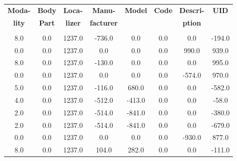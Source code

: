 \begin{table}
\centering
\begin{tabular}{|c|c|c|c|c|c|c|c|}
\bfseries{\footnotesize Moda-}&\bfseries{\footnotesize Body}&\bfseries{\footnotesize Loca-}&\bfseries{\footnotesize Manu-}&\bfseries{\footnotesize Model}&\bfseries{\footnotesize Code}&\bfseries{\footnotesize Descri-}&\bfseries{\footnotesize UID}\\
\bfseries{\footnotesize lity} & \bfseries{\footnotesize Part}& \bfseries{\footnotesize lizer}& \bfseries{\footnotesize facturer}& &\bfseries{\footnotesize  }&\bfseries{\footnotesize ption}&\\
&&&&&&&\\
\footnotesize 8.0&\footnotesize 0.0&\footnotesize 1237.0&\footnotesize -736.0&\footnotesize 0.0&\footnotesize 0.0&\footnotesize 0.0&\footnotesize -194.0\\
\footnotesize 0.0&\footnotesize 0.0&\footnotesize 1237.0&\footnotesize 0.0&\footnotesize 0.0&\footnotesize 0.0&\footnotesize 990.0&\footnotesize 939.0\\
\footnotesize 8.0&\footnotesize 0.0&\footnotesize 1237.0&\footnotesize -130.0&\footnotesize 0.0&\footnotesize 0.0&\footnotesize 0.0&\footnotesize 995.0\\
\footnotesize 0.0&\footnotesize 0.0&\footnotesize 1237.0&\footnotesize 0.0&\footnotesize 0.0&\footnotesize 0.0&\footnotesize -574.0&\footnotesize 970.0\\
\footnotesize 5.0&\footnotesize 0.0&\footnotesize 1237.0&\footnotesize -116.0&\footnotesize 680.0&\footnotesize 0.0&\footnotesize 0.0&\footnotesize -582.0\\
\footnotesize 4.0&\footnotesize 0.0&\footnotesize 1237.0&\footnotesize -512.0&\footnotesize -413.0&\footnotesize 0.0&\footnotesize 0.0&\footnotesize -58.0\\
\footnotesize 2.0&\footnotesize 0.0&\footnotesize 1237.0&\footnotesize -514.0&\footnotesize -841.0&\footnotesize 0.0&\footnotesize 0.0&\footnotesize -380.0\\
\footnotesize 2.0&\footnotesize 0.0&\footnotesize 1237.0&\footnotesize -514.0&\footnotesize -841.0&\footnotesize 0.0&\footnotesize 0.0&\footnotesize -679.0\\
\footnotesize 0.0&\footnotesize 0.0&\footnotesize 1237.0&\footnotesize 0.0&\footnotesize 0.0&\footnotesize 0.0&\footnotesize -930.0&\footnotesize 877.0\\
\footnotesize 8.0&\footnotesize 0.0&\footnotesize 1237.0&\footnotesize 104.0&\footnotesize 282.0&\footnotesize 0.0&\footnotesize 0.0&\footnotesize -111.0\\

\end{tabular}
\end{table}
